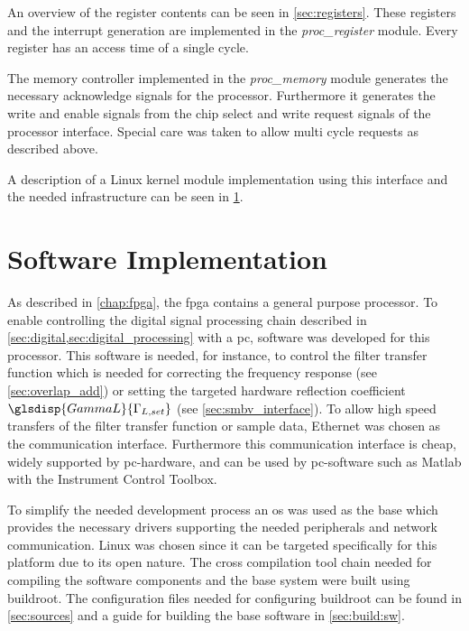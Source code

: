 \documentclass[12pt,a4paper,parskip=full,abstract=true,BCOR=12mm]{scrreprt}
\def\device#1{\mbox{\textit{#1}}}
\begin{document}
An overview of the register contents can be seen in \cref{sec:registers}. These
registers and the interrupt generation are implemented in the \device{proc\_register}
module. Every register has an access time of a single cycle.

The memory controller implemented in the \device{proc\_memory} module generates
the necessary acknowledge signals for the processor. Furthermore it generates the
write and enable signals from the chip select and write request signals of the
processor interface. Special care was taken to allow multi cycle requests as
described above.

A description of a Linux kernel module implementation using this interface
and the needed infrastructure can be seen in \cref{chap:software}.


\chapter{Software Implementation}
\label{chap:software}

As described in \cref{chap:fpga}, the \gls{fpga} contains a general
purpose processor. To enable controlling the digital signal processing chain
described in \cref{sec:digital,sec:digital_processing} with a \gls{pc},
software was developed for this processor. This software is needed, for instance, to control the
filter transfer function which is needed for correcting the frequency response (see
\cref{sec:overlap_add}) or setting the targeted hardware reflection coefficient $\glsdisp{GammaL}{\Gamma_{L,set}}$ (see
\cref{sec:smbv_interface}). To allow high speed transfers of the filter
transfer function or sample data, Ethernet was chosen as the communication
interface. Furthermore this communication interface is cheap, widely supported
by \gls{pc}-hardware, and can be used by \gls{pc}-software such as Matlab with the
Instrument Control Toolbox.

To simplify the needed development process an \gls{os} was used as the base which
provides the necessary drivers supporting the needed peripherals and
network communication. Linux was chosen since it can be targeted
specifically for this platform due to its open nature. The cross compilation tool
chain needed for compiling the software
components and the base system were built using buildroot\cite{buildroot}. The
configuration files needed for configuring buildroot can be found in
\cref{sec:sources} and a guide for building the base software in \cref{sec:build:sw}.
\end{document}
